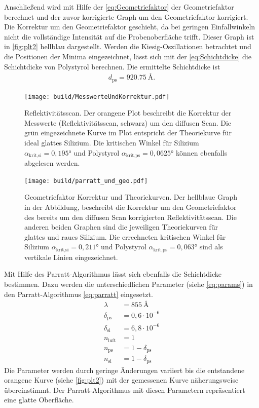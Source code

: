 Anschließend wird mit Hilfe der \autoref{eq:Geometriefaktor} der Geometriefaktor berechnet und der zuvor korrigierte Graph um den Geometriefaktor korrigiert. 
Die Korrektur um den Geometriefaktor geschieht, da bei geringen Einfallwinkeln nicht die vollständige Intensität auf die Probenoberfläche trifft. 
Dieser Graph ist in \autoref{fig:plt2} hellblau dargestellt. 
Werden die Kiesig-Oszillationen betrachtet und die Positionen der Minima eingezeichnet, lässt sich mit der \autoref{eq:Schichtdicke} die 
Schichtdicke von Polystyrol berechnen.
Die ermittelte Schichtdicke ist
\begin{align*}
    d_\text{ps} = \SI{920,75}{\angstrom}.
\end{align*}
\begin{figure}
    \centering                         
    \texttt{[image: build/MesswerteUndKorrektur.pdf]}
    \caption{Reflektivitätsscan. Der orangene Plot beschreibt die Korrektur der Messwerte (Reflektivitätsscan, schwarz) um den
    diffusen Scan. Die grün eingezeichnete Kurve im Plot entspricht der Theoriekurve für ideal glattes Silizium. 
    Die kritischen Winkel für Silizium $\alpha_\text{krit,si} = 0,195°$ und Polystyrol $\alpha_\text{krit,ps} = 0,0625°$
     können ebenfalls abgelesen werden.}
    \label{fig:plt1}
\end{figure}
\FloatBarrier

\newpage
\begin{figure}
    \centering                         
    \texttt{[image: build/parratt\_und\_geo.pdf]}
    \caption{Geometriefaktor Korrektur und Theoriekurven.
    Der hellblaue Graph in der Abbildung, beschreibt die Korrektur um den Geometriefaktor
    des bereits um den diffusen Scan 
    korrigierten Reflektivitätsscan. 
    Die anderen beiden Graphen sind die jeweiligen 
    Theoriekurven für glattes und raues Silizium. Die errechneten kritischen Winkel für Silizium 
    $\alpha_\text{krit,si} = 0,211°$ und Polystyrol $\alpha_\text{krit,ps} = 0,063°$ sind als vertikale Linien eingezeichnet. }
    \label{fig:plt2}
\end{figure}
\FloatBarrier
Mit Hilfe des Parratt-Algorithmus lässt sich ebenfalls die Schichtdicke bestimmen. 
Dazu werden die unterschiedlichen Parameter (siehe \autoref{eq:params}) in den Parratt-Algorithmus \autoref{eq:parratt} eingesetzt.
\begin{equation}\label{eq:params}    
    \begin{split}
        \lambda &= \SI{855}{\angstrom}\\
        \delta_\text{ps} &= 0,6\cdot 10^{-6}\\
        \delta_\text{si}&= 6,8\cdot 10^{-6} \\
        n_\text{luft} &= 1 \\
        n_\text{ps} &= 1 - \delta_\text{ps} \\
        n_\text{si} &= 1 - \delta_\text{ps} 
    \end{split}
\end{equation}
Die Parameter werden durch geringe Änderungen variiert bis die entstandene orangene Kurve (siehe \autoref{fig:plt2}) mit der gemessenen
Kurve näherungsweise übereinstimmt. 
Der Parratt-Algorithmus mit diesen Parametern repräsentiert eine glatte Oberfläche.

